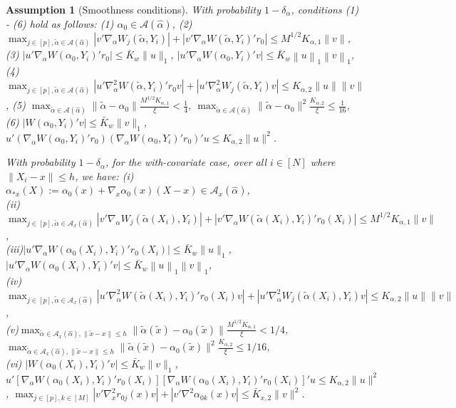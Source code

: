 \documentclass[11pt]{article}
\newtheorem{assumption}{Assumption}
\newcommand{\norm}[1]{\left\lVert #1 \right\rVert}
\begin{document}
\begin{assumption}[Smoothness conditions]\label{ass:smoothness-assumptions}
With probability $1-\delta_\alpha$, conditions (1) - (6) hold as follows: (1) $\alpha_0\in\mathcal{A}(\hat{\alpha})$, (2) ${\displaystyle\max_{j\in [p], \tilde \alpha \in \mathcal{A}(\hat\alpha)}}|v'\nabla_\alpha W_j(\tilde \alpha,Y_i)|  +|v'\nabla_\alpha W(\tilde \alpha,Y_i)'r_0| \leq M^{1/2}K_{\alpha,1}\|v\|$, \\
(3) $|u'\nabla_{\alpha}W(\alpha_0,Y_i)'r_0|\leq\bar{K}_w\|u\|_1$, $|u'\nabla_{\alpha}W(\alpha_0,Y_i)'v|\leq \bar{K}_w\norm{u}_1\norm{v}_{1}$, \\
(4) $\displaystyle\max_{j \in [p], \tilde \alpha \in \mathcal{A}(\hat\alpha)}|u'\nabla_\alpha^2 W(\tilde\alpha,Y_i)'r_0v|+|u'\nabla_\alpha^2 W_j(\tilde\alpha,Y_i)v|\leq K_{\alpha,2}\|u\|\|v\|$, (5) ${\displaystyle \max_{\tilde\alpha \in \mathcal{A}(\hat\alpha)}}\|\tilde \alpha-\alpha_0\|\frac{M^{1/2}K_{\alpha,1}}{\xi}<\frac{1}{4}$, ${\displaystyle\max_{\tilde\alpha \in \mathcal{A}(\hat\alpha)}}\|\tilde\alpha-\alpha_0\|^2 \frac{K_{\alpha,2}}{\xi}\leq\frac{1}{16}$, (6) $|W(\alpha_0,Y_i)'v|\leq\bar{K}_w\|v\|_1$, $u'(\nabla_{\alpha}W(\alpha_0,Y_i)'r_0)(\nabla_{\alpha}W(\alpha_0,Y_i)'r_0)'u\leq K_{\alpha,2}\|u\|^2$.

\noindent With probability $1-\delta_\alpha$, for the with-covariate case, over all $i\in[N]$ where $\|X_i-x\|\leq h$, we have:
(i) {$\alpha_{*x}(X):=\alpha_0(x)+\nabla_x\alpha_0(x)(X-x) \in \mathcal{A}_x(\hat\alpha)$},\\
(ii) ${\displaystyle\max_{j\in [p], \tilde \alpha \in \mathcal{A}_x(\hat\alpha)}}|v'\nabla_\alpha W_j(\tilde \alpha(X_i),Y_i)|  +|v'\nabla_\alpha W(\tilde \alpha(X_i),Y_i)'r_0(X_i)| \leq M^{1/2}K_{\alpha,1}\|v\|$, \\
(iii)$|u'\nabla_{\alpha}W(\alpha_0(X_i),Y_i)'r_0(X_i)|\leq\bar{K}_w\|u\|_1$, $|u'\nabla_{\alpha}W(\alpha_0(X_i),Y_i)'v|\leq \bar{K}_w\norm{u}_1\norm{v}_{1}$,\\
(iv)$\displaystyle\max_{j \in [p], \tilde \alpha \in \mathcal{A}_x(\hat\alpha)}|u'\nabla_\alpha^2 W(\tilde\alpha(X_i),Y_i)'r_0(X_i)v|+|u'\nabla_\alpha^2 W_j(\tilde\alpha(X_i),Y_i)v|\leq K_{\alpha,2}\|u\|\|v\|$,\\
(v)${\displaystyle \max_{\tilde\alpha \in \mathcal{A}_x(\hat\alpha),\|\tilde x-x\|\leq h}}\|\tilde \alpha(\tilde x)-\alpha_0(\tilde x)\|\frac{M^{1/2}K_{\alpha,1}}{\xi}<1/4$,  ${\displaystyle \max_{\tilde\alpha \in \mathcal{A}_x(\hat\alpha),\|\tilde x-x\|\leq h}}\|\tilde \alpha(\tilde x)-\alpha_0(\tilde{x})\|^2 \frac{K_{\alpha,2}}{\xi}\leq1/16$,\\
(vi) $|W(\alpha_0(X_i),Y_i)'v|\leq\bar{K}_w\|v\|_1$, $u'[\nabla_{\alpha}W(\alpha_0(X_i),Y_i)'r_0(X_i)][\nabla_{\alpha}W(\alpha_0(X_i),Y_i)'r_0(X_i)]'u\leq K_{\alpha,2}\|u\|^2$, ${\displaystyle\max_{j\in [p], k\in[M]}}|v'\nabla_{x}^2 r_{0j}(x)v|+ |v'\nabla^2\alpha_{0k}(x)v|\leq \bar{K}_{x,2}\|v\|^2$.
\end{assumption}
\end{document}
